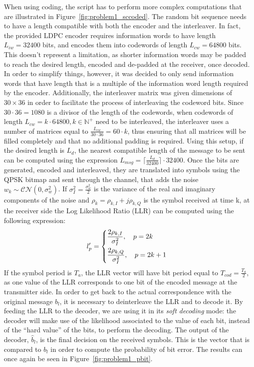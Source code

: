 \documentclass[10pt]{article}
\begin{document}

When using coding, the script has to perform more complex computations that are illustrated in Figure~\ref{fig:problem1_sccoded}. The random bit sequence needs to have a length compatible with both the encoder and the interleaver. In fact, the provided LDPC encoder requires information words to have length $L_{iw} = 32400$ bits, and encodes them into codewords of length $L_{cw} = 64800$ bits. This doesn't represent a limitation, as shorter information words may be padded to reach the desired length, encoded and de-padded at the receiver, once decoded. In order to simplify things, however, it was decided to only send information words that have length that is a multiple of the information word length required by the encoder. Additionally, the interleaver matrix was given dimensions of $30 \times 36$ in order to facilitate the process of interleaving the codeword bits. Since $30 \cdot 36 = 1080$ is a divisor of the length of the codewords, when codewords of length $L_{cw} = k \cdot 64800, k \in \mathbb{N^{+}}$ need to be interleaved, the interleaver uses a number of matrices equal to $\frac{L_{cw}}{30\cdot36} = 60 \cdot k$, thus ensuring that all matrices will be filled completely and that no additional padding is required. Using this setup, if the desired length is $L_d$, the nearest compatible length of the message to be sent can be computed using the expression $L_{msg} = \lceil \frac{L_{d}}{32400} \rceil \cdot 32400$. Once the bits are generated, encoded and interleaved, they are translated into symbols using the QPSK bitmap and sent through the channel, that adds the noise $w_k \sim \mathcal{CN}(0, \sigma_w^2)$. If $\sigma^2_I = \frac{\sigma^2_w}{2}$ is the variance of the real and imaginary components of the noise and $\rho_k = \rho_{k,I} + j \rho_{k,Q}$ is the symbol received at time k, at the receiver side the Log Likelihood Ratio (LLR) can be computed using the following expression:
\begin{equation}
	l'_p =
	\begin{dcases}
	\frac{2 \rho_{k,I}}{\sigma_I^2}, \quad p = 2k \\
	\frac{2 \rho_{k,Q}}{\sigma_I^2}, \quad p = 2k +1
	\end{dcases}
\end{equation}
If the symbol period is $T_a$, the LLR vector will have bit period equal to $T_{cod} = \frac{T_a}{2}$, as one value of the LLR corresponds to one bit of the encoded message at the transmitter side. In order to get back to the actual correspondence with the original message $b_l$, it is necessary to deinterleave the LLR and to decode it. By feeding the LLR to the decoder, we are using it in its \emph{soft decoding} mode: the decoder will make use of the likelihood associated to the value of each bit, instead of the ``hard value'' of the bits, to perform the decoding. %
The output of the decoder, $\hat{b}_l$, is the final decision on the received symbols. This is the vector that is compared to $b_l$ in order to compute the probability of bit error. The results can once again be seen in Figure~\ref{fig:problem1_pbit}. 
\end{document}
